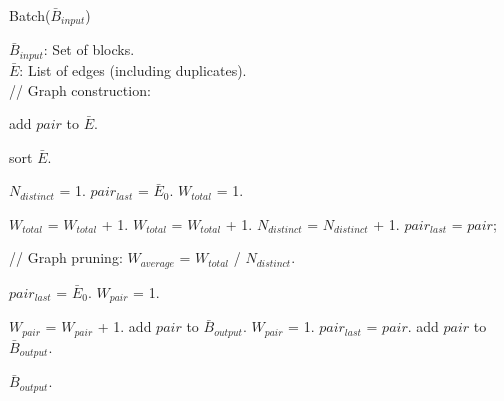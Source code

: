\begin{algorithm}[H]
\caption{{\sc Batch($\bar B_{input}$)}}
\begin{algorithmic}

\REQUIRE $\bar B_{input}$: Set of blocks. \\
\STATE $\bar E$: List of edges (including duplicates). \\
\STATE // Graph construction:

    \STATE add $pair$ to $\bar E$.
  \ENDFOR
\ENDFOR

\STATE sort $\bar E$.

\STATE $N_{distinct}$ = 1.
\STATE $pair_{last}$ = $\bar E_{0}$.
\STATE $W_{total}$ = 1.

    \STATE $W_{total}$ = $W_{total}$ + 1.
  \ELSE
    \STATE $W_{total}$ = $W_{total}$ + 1.
    \STATE $N_{distinct}$ = $N_{distinct}$ + 1.
    \STATE $pair_{last}$ = $pair$;
  \ENDIF
\ENDFOR

\STATE // Graph pruning:
\STATE $W_{average}$ = $W_{total}$ / $N_{distinct}$.

\STATE $pair_{last}$ = $\bar E_{0}$.
\STATE $W_{pair}$ = 1.

    \STATE $W_{pair}$ = $W_{pair}$ + 1.
  \ELSE
      \STATE add $pair$ to $\bar B_{output}$.
    \ENDIF
    \STATE $W_{pair}$ = 1.
    \STATE $pair_{last}$ = $pair$.
  \ENDIF
\ENDFOR
{}
  \STATE add $pair$ to $\bar B_{output}$.
\ENDIF

\RETURN $\bar B_{output}$. \\

\end{algorithmic}
\end{algorithm}
